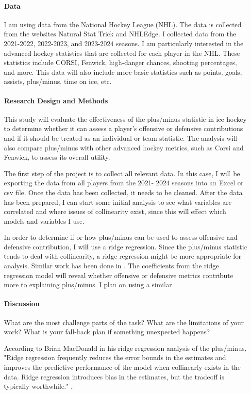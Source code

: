 \documentclass[12pt]{article}
\begin{document}
\paragraph{Data}

I am using data from the National Hockey League (NHL). The data is collected from the websites Natural Stat Trick and NHLEdge. 
I collected data from the 2021-2022, 2022-2023, and 2023-2024 seasons. I am particularly interested in the advanced hockey 
statistics that are collected for each player in the NHL. These statistics include CORSI, Fenwick, high-danger chances,
shooting percentages, and more. This data will also include more basic statistics such as points, goals, assists, plus/minus,
time on ice, etc.


\paragraph{Research Design and Methods}
This study will evaluate the effectiveness of the plus/minus statistic in ice hockey to determine whether it can assess a 
player's offensive or defensive contributions and if it should be treated as an individual or team statistic. The analysis 
will also compare plus/minus with other advanced hockey metrics, such as Corsi and Fenwick, to assess its overall utility.

The first step of the project is to collect all relevant data. In this case, I will be exporting the data from all players
from the 2021- 2024 seasons into an Excel or csv file. Once the data has been collected, it needs to be cleaned. After the
data has been prepared, I can start some initial analysis to see what variables are correlated and where issues of collinearity 
exist, since this will effect which models and variables I use. 

In order to determine if or how plus/minus can be used to assess offensive and defensive contribution, I will use a ridge 
regression. Since the plus/minus statistic tends to deal with collinearity, a ridge regression might be more appropriate for 
analysis. Similar work has been done in \cite{Macdonald_2012}. The coefficients from the ridge regression model will reveal 
whether offensive or defensive metrics contribute more to explaining plus/minus. I plan on using a similar 



\paragraph{Discussion}
What are the most challenge parts of the task?
What are the limitations of your work? What is your fall-back plan if
something unexpected happens?

According to Brian MacDonald in his ridge regression analysis of the plus/minus, "Ridge regression frequently reduces the error 
bounds in the estimates and improves the predictive performance of the model when collinearly exists in the data. Ridge regression 
introduces bias in the estimates, but the tradeoff is typically worthwhile." \cite{Macdonald_2012}.



\end{document}

